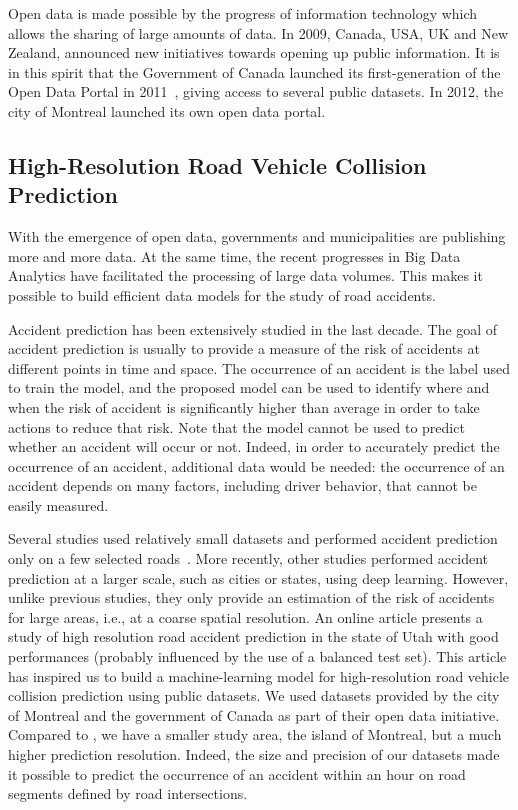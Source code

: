 \documentclass[conference]{IEEEtran}
\begin{document}
Open data is made possible by the progress of information technology which allows the sharing of large amounts of data. In 2009, Canada, USA, UK and New Zealand, announced new initiatives towards opening up public information. It is in this spirit that the Government of Canada launched its first-generation of the Open Data Portal in 2011~\cite{opendata101}, giving access to several public datasets. In 2012, the city of Montreal launched its own open data portal.


\subsection{High-Resolution Road Vehicle Collision Prediction}

With the emergence of open data, governments and municipalities are publishing more and more data. At the same time, the recent progresses in Big Data Analytics have facilitated the processing of large data volumes. This makes it possible to build efficient data models for the study of road accidents.

Accident prediction has been extensively studied in the last decade. 
The goal of accident prediction is usually to provide a measure of the risk of accidents at different points in time and space. 
The occurrence of an accident is the label used to train the model, and the proposed model can be used to identify where and when the risk of accident is significantly higher than average in order to take actions to reduce that risk. 
Note that the model cannot be used to predict whether an accident will occur or not. 
Indeed, in order to accurately predict the occurrence of an accident, additional data would be needed: the occurrence of an accident depends on many factors, including driver behavior, that cannot be easily measured. 

Several studies used relatively small datasets and performed accident prediction only on a few selected roads~\cite{Chang2005, Chang2005b, Lin2015, Theofilatos2017}. More recently, other studies performed accident prediction at a larger scale, such as cities or states, using deep
learning\cite{QChen2016, Najjar2017, Yuan2018}.
However, unlike previous studies, they only provide an estimation of the risk of accidents for large areas, i.e., at a coarse spatial resolution. An online article\cite{mediumarticle} presents a study of high resolution road accident prediction in the state of Utah with good performances (probably influenced by the use of a balanced test set). This article has inspired us to build a machine-learning model for high-resolution road vehicle collision prediction using public datasets. We used datasets provided by the city of Montreal and the government of Canada as part of their open data initiative. Compared to \cite{mediumarticle}, we have a smaller study area, the island of Montreal, but a much higher prediction resolution. Indeed, the size and precision of our datasets made it possible to predict the occurrence of an accident within an hour on road segments defined by road intersections.
\end{document}
